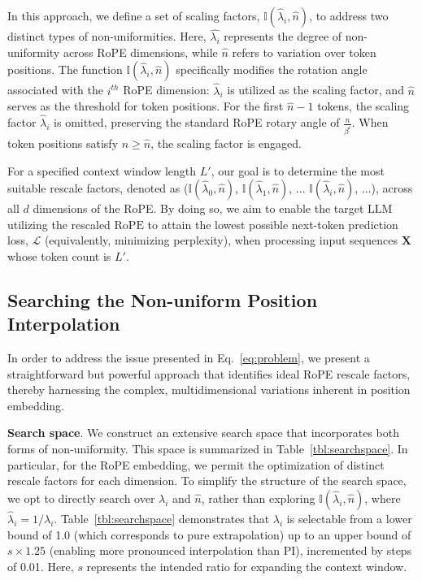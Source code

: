 In this approach, we define a set of scaling factors, $\mathbb{I}(\hat{\lambda}_{i},\hat{n})$, to address two distinct types of non-uniformities. Here, $\hat{\lambda_i}$ represents the degree of non-uniformity across RoPE dimensions, while $\hat{n}$ refers to variation over token positions. The function $\mathbb{I}(\hat{\lambda}_{i},\hat{n})$ specifically modifies the rotation angle associated with the $i^{th}$ RoPE dimension: $\hat\lambda_{i}$ is utilized as the scaling factor, and $\hat{n}$ serves as the threshold for token positions. For the first $\hat{n}-1$ tokens, the scaling factor $\hat\lambda_{i}$ is omitted, preserving the standard RoPE rotary angle of $\frac{n}{\beta^i}$. When token positions satisfy $n\ge\hat{n}$, the scaling factor is engaged.

For a specified context window length $L'$, our goal is to determine the most suitable rescale factors, denoted as ($\mathbb{I}(\hat{\lambda}_{0},\hat{n})$, $\mathbb{I}(\hat{\lambda}_{1},\hat{n})$, ... $\mathbb{I}(\hat{\lambda}_{i},\hat{n})$, ...), across all $d$ dimensions of the RoPE. By doing so, we aim to enable the target $\text{LLM}$ utilizing the rescaled $\text{RoPE}$ to attain the lowest possible next-token prediction loss, $\mathcal{L}$ (equivalently, minimizing perplexity), when processing input sequences $\mathbf{X}$ whose token count is $L'$.

\subsection{Searching the Non-uniform Position Interpolation}

In order to address the issue presented in Eq.~\ref{eq:problem}, we present a straightforward but powerful approach that identifies ideal RoPE rescale factors, thereby harnessing the complex, multidimensional variations inherent in position embedding.

\textbf{Search space}. We construct an extensive search space that incorporates both forms of non-uniformity. This space is summarized in Table~\ref{tbl:searchspace}. In particular, for the RoPE embedding, we permit the optimization of distinct rescale factors for each dimension. To simplify the structure of the search space, we opt to directly search over $\lambda_i$ and $\hat{n}$, rather than exploring $\mathbb{I}(\hat{\lambda}_{i},\hat{n})$, where $\hat{\lambda}_{i}=1/\lambda_i$. Table~\ref{tbl:searchspace} demonstrates that $\lambda_i$ is selectable from a lower bound of 1.0 (which corresponds to pure extrapolation) up to an upper bound of $s\times1.25$ (enabling more pronounced interpolation than PI), incremented by steps of 0.01. Here, $s$ represents the intended ratio for expanding the context window.


